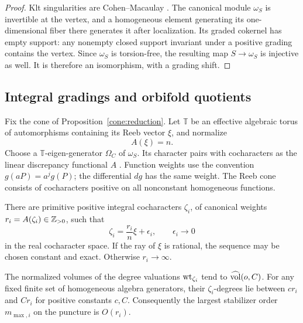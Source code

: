 \begin{proof}
Klt singularities are Cohen--Macaulay
\cite[Definition~117 and Theorem~120]{KollarCanonicalModels10}.
The canonical module
\(\omega_S\) is invertible at the vertex, and a homogeneous
element generating its one-dimensional fiber there generates
it after localization. Its graded cokernel has empty support:
any nonempty closed support invariant under a positive
grading contains the vertex. Since \(\omega_S\) is torsion-free,
the resulting map \(S\to\omega_S\) is injective as well.
It is therefore an isomorphism, with a grading shift.
\end{proof}

\subsection{Integral gradings and orbifold quotients}

Fix the cone of Proposition~\ref{cone:reduction}. Let \(\mathbb T\)
be an effective algebraic torus of automorphisms containing its
Reeb vector \(\xi\), and normalize
\[
                              A(\xi)=n.
\]
Choose a \(\mathbb T\)-eigen-generator \(\Omega_C\) of
\(\omega_S\). Its character pairs with cocharacters as the
linear discrepancy functional \(A\)
\cite[Lemmas~2.16 and~2.18]{LiXu18}. Function weights use the
convention \(g(aP)=a^j g(P)\); the differential \(dg\) has the
same weight. The Reeb cone consists of cocharacters positive
on all nonconstant homogeneous functions.

\begin{lemma}\label{cone:approximation}
There are primitive positive integral cocharacters \(\zeta_i\),
of canonical weights \(r_i=A(\zeta_i)\in\mathbb Z_{>0}\), such that
\begin{equation}\label{cone:eq-fast}
             \zeta_i=\frac{r_i}{n}\xi+\epsilon_i,\qquad
             \epsilon_i\longrightarrow0
\end{equation}
in the real cocharacter space. If the ray of \(\xi\) is
rational, the sequence may be chosen constant and exact.
Otherwise \(r_i\to\infty\).

The normalized volumes of the degree valuations
\(\operatorname{wt}_{\zeta_i}\) tend to \(\widehat{\operatorname{vol}}(o,C)\).
For any fixed finite set of homogeneous algebra generators,
their \(\zeta_i\)-degrees lie between \(cr_i\) and \(Cr_i\)
for positive constants \(c,C\). Consequently the largest
stabilizer order \(m_{\max,i}\) on the puncture is \(O(r_i)\).
\end{lemma}

